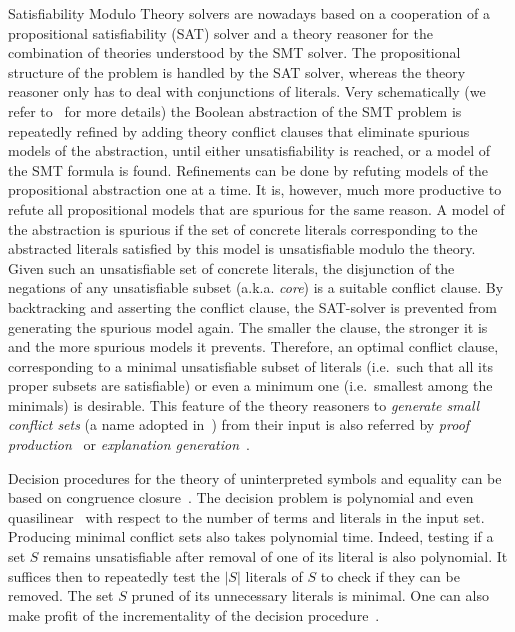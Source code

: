 \documentclass{easychair}
\begin{document}
Satisfiability Modulo Theory solvers are nowadays based on a cooperation of a
propositional satisfiability (SAT) solver and a theory reasoner for the
combination of theories understood by the SMT solver. The propositional
structure of the problem is handled by the SAT solver, whereas the theory
reasoner only has to deal with conjunctions of literals.  Very schematically (we
refer to~\cite{Barrett14} for more details) the Boolean abstraction of the SMT
problem is repeatedly refined by adding theory conflict clauses that eliminate
spurious models of the abstraction, until either unsatisfiability is reached, or
a model of the SMT formula is found.  Refinements can be done by refuting models
of the propositional abstraction one at a time.  It is, however, much more
productive to refute all propositional models that are spurious for the same
reason.  A model of the abstraction is spurious if the set of concrete literals
corresponding to the abstracted literals satisfied by this model is
unsatisfiable modulo the theory.  Given such an unsatisfiable set of concrete literals, the
disjunction of the negations of any unsatisfiable subset (a.k.a. \emph{core}) is a suitable
conflict clause.  By backtracking and asserting the conflict clause, the
SAT-solver is prevented from generating the spurious model again. The smaller
the clause, the stronger it is and the more spurious models it prevents.
Therefore, an optimal conflict clause, corresponding to a minimal unsatisfiable
subset of literals (i.e.\ such that all its proper subsets are satisfiable) or
even a minimum one (i.e.\ smallest among the minimals) is desirable.  This
feature of the theory reasoners to \emph{generate small conflict sets} (a name
adopted in~\cite{Barrett14}) from their input is also referred by \emph{proof
production}~\cite{Nieuwenhuis3,Nieuwenhuis9} or \emph{explanation
generation}~\cite{Nieuwenhuis6}.

Decision procedures for the theory of uninterpreted symbols and equality can be
based on congruence closure~\cite{Nelson2,Downey1,Nieuwenhuis6}.  The decision problem is polynomial
and even quasilinear~\cite{Downey1} with respect to the number of terms and
literals in the input set.  Producing minimal conflict sets also takes
polynomial time.  Indeed, testing if a set $S$ remains unsatisfiable after
removal of one of its literal is also polynomial.  It suffices then to
repeatedly test the $|S|$ literals of $S$ to check if they can be removed.  The
set $S$ pruned of its unnecessary literals is minimal.  One can also make profit of the incrementality of the decision procedure~\cite{Fontaine1}.
\end{document}
